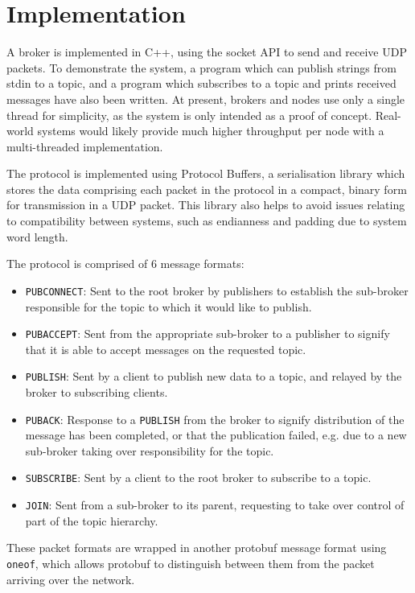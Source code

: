 \documentclass[conference, a4paper]{IEEEtran}
\begin{document}
    \section{Implementation}
        A broker is implemented in C++, using the socket API to send and receive UDP packets.
        To demonstrate the system, a program which can publish strings from stdin to a topic, and a program which subscribes to a topic and prints received messages have also been written.
        At present, brokers and nodes use only a single thread for simplicity, as the system is only intended as a proof of concept.
        Real-world systems would likely provide much higher throughput per node with a multi-threaded implementation.


        The protocol is implemented using Protocol Buffers\autocite{protobuf}, a serialisation library which stores the data comprising each packet in the protocol in a compact, binary form for transmission in a UDP packet.
        This library also helps to avoid issues relating to compatibility between systems, such as endianness and padding due to system word length.


        The protocol is comprised of 6 message formats:
        \begin{itemize}
            \item \texttt{PUBCONNECT}: Sent to the root broker by publishers to establish the sub-broker responsible for the topic to which it would like to publish.
            \item \texttt{PUBACCEPT}: Sent from the appropriate sub-broker to a publisher to signify that it is able to accept messages on the requested topic.
            \item \texttt{PUBLISH}: Sent by a client to publish new data to a topic, and relayed by the broker to subscribing clients.
            \item \texttt{PUBACK}: Response to a \texttt{PUBLISH} from the broker to signify distribution of the message has been completed, or that the publication failed, e.g. due to a new sub-broker taking over responsibility for the topic.
            \item \texttt{SUBSCRIBE}: Sent by a client to the root broker to subscribe to a topic.
            \item \texttt{JOIN}: Sent from a sub-broker to its parent, requesting to take over control of part of the topic hierarchy.
        \end{itemize}
        These packet formats are wrapped in another protobuf message format using \texttt{oneof}, which allows protobuf to distinguish between them from the packet arriving over the network.
\end{document}
